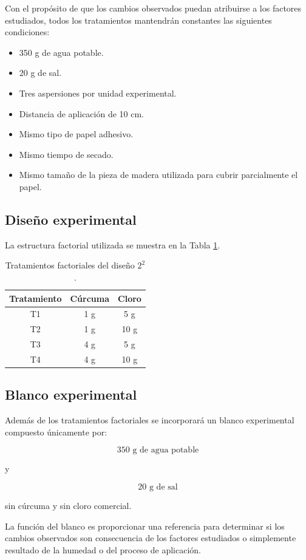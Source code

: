 Con el propósito de que los cambios observados puedan atribuirse a los factores estudiados, todos los tratamientos mantendrán constantes las siguientes condiciones:

\begin{itemize}
\item 350 g de agua potable.
\item 20 g de sal.
\item Tres aspersiones por unidad experimental.
\item Distancia de aplicación de 10 cm.
\item Mismo tipo de papel adhesivo.
\item Mismo tiempo de secado.
\item Mismo tamaño de la pieza de madera utilizada para cubrir parcialmente el papel.
\end{itemize}

\subsection{Diseño experimental}

La estructura factorial utilizada se muestra en la Tabla \ref{tab:factorial}.

\begin{table}[H]
\centering
\caption{Tratamientos factoriales del diseño $2^2$.}
\label{tab:factorial}
\begin{tabular}{ccc}
\hline
Tratamiento & Cúrcuma & Cloro \\
\hline
T1 & 1 g & 5 g \\
T2 & 1 g & 10 g \\
T3 & 4 g & 5 g \\
T4 & 4 g & 10 g \\
\hline
\end{tabular}
\end{table}

\subsection{Blanco experimental}

Además de los tratamientos factoriales se incorporará un blanco experimental compuesto únicamente por:

\[
350 \text{ g de agua potable}
\]

y

\[
20 \text{ g de sal}
\]

sin cúrcuma y sin cloro comercial.

La función del blanco es proporcionar una referencia para determinar si los cambios observados son consecuencia de los factores estudiados o simplemente resultado de la humedad o del proceso de aplicación.

